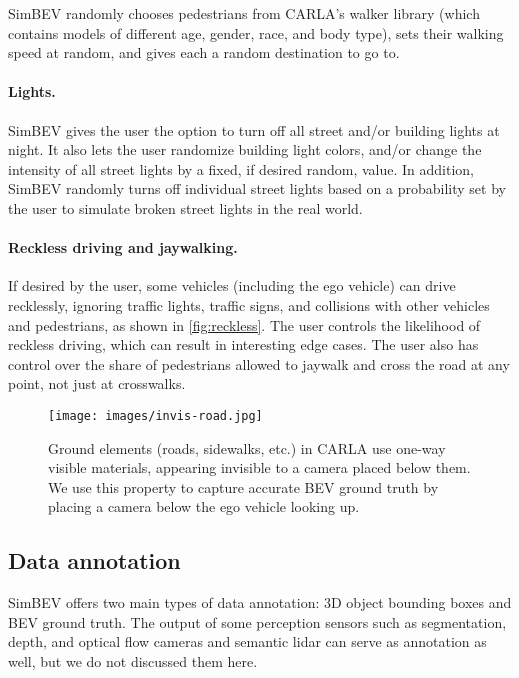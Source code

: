 SimBEV randomly chooses pedestrians from CARLA's walker library (which contains models of different age, gender, race, and body type), sets their walking speed at random, and gives each a random destination to go to.

\paragraph{Lights.} \label{par:lights}

SimBEV gives the user the option to turn off all street and/or building lights at night. It also lets the user randomize building light colors, and/or change the intensity of all street lights by a fixed, if desired random, value. In addition, SimBEV randomly turns off individual street lights based on a probability set by the user to simulate broken street lights in the real world.

\paragraph{Reckless driving and jaywalking.} \label{par:reckless}

If desired by the user, some vehicles (including the ego vehicle) can drive recklessly, ignoring traffic lights, traffic signs, and collisions with other vehicles and pedestrians, as shown in \cref{fig:reckless}. The user controls the likelihood of reckless driving, which can result in interesting edge cases. The user also has control over the share of pedestrians allowed to jaywalk and cross the road at any point, not just at crosswalks.

\begin{figure}[t]
    \centering
    \texttt{[image: images/invis-road.jpg]}
    \setlength{\abovecaptionskip}{-8 pt}
    \setlength{\belowcaptionskip}{-8 pt}
    \caption{Ground elements (roads, sidewalks, etc.) in CARLA use one-way visible materials, appearing invisible to a camera placed below them. We use this property to capture accurate BEV ground truth by placing a camera below the ego vehicle looking up.}\label{fig:invis-road}
\end{figure}

\subsection{Data annotation} \label{subsec:simbev-gt}

SimBEV offers two main types of data annotation: 3D object bounding boxes and BEV ground truth. The output of some perception sensors such as segmentation, depth, and optical flow cameras and semantic lidar can serve as annotation as well, but we do not discussed them here.

